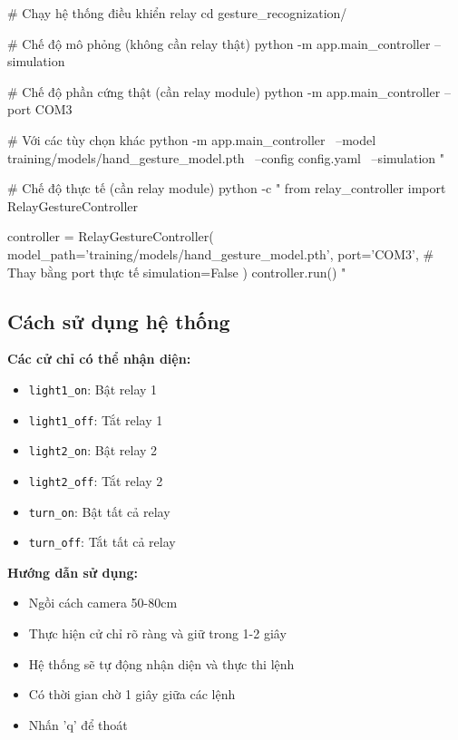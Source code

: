 \begin{aivncodebox}
\begin{python}
# Chạy hệ thống điều khiển relay
cd gesture_recognization/

# Chế độ mô phỏng (không cần relay thật)
python -m app.main_controller --simulation

# Chế độ phần cứng thật (cần relay module)
python -m app.main_controller --port COM3

# Với các tùy chọn khác
python -m app.main_controller \
    --model training/models/hand_gesture_model.pth \
    --config config.yaml \
    --simulation
"

# Chế độ thực tế (cần relay module)
python -c "
from relay_controller import RelayGestureController

controller = RelayGestureController(
    model_path='training/models/hand_gesture_model.pth',
    port='COM3',  # Thay bằng port thực tế
    simulation=False
)
controller.run()
"
\end{python}
\end{aivncodebox}

\subsection{Cách sử dụng hệ thống}

\textbf{Các cử chỉ có thể nhận diện:}
\begin{itemize}
    \item \texttt{light1\_on}: Bật relay 1
    \item \texttt{light1\_off}: Tắt relay 1
    \item \texttt{light2\_on}: Bật relay 2
    \item \texttt{light2\_off}: Tắt relay 2
    \item \texttt{turn\_on}: Bật tất cả relay
    \item \texttt{turn\_off}: Tắt tất cả relay
\end{itemize}

\textbf{Hướng dẫn sử dụng:}
\begin{itemize}
    \item Ngồi cách camera 50-80cm
    \item Thực hiện cử chỉ rõ ràng và giữ trong 1-2 giây
    \item Hệ thống sẽ tự động nhận diện và thực thi lệnh
    \item Có thời gian chờ 1 giây giữa các lệnh
    \item Nhấn 'q' để thoát
\end{itemize}

